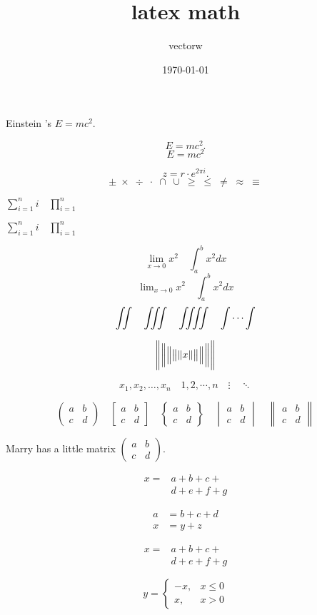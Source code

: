 \documentclass{article}
\title{latex math}
\author{vectorw}
\date{\today}
\begin{document}
Einstein 's $E=mc^2$.

\[ E=mc^2. \]
\begin{equation}
E=mc^2
\end{equation}

\[ z = r\cdot e^{2\pi i}. \]
\[ \pm\; \times\; \div\; \cdot\; \cap\; \cup\;
\geq\; \leq\; \neq\; \approx\; \equiv \]

$ \sum_{i=1}^n i\quad \prod_{i=1}^n $

$ \sum\limits _{i=1}^n i\quad \prod\limits _{i=1}^n $

\[ \lim_{x\to0}x^2 \quad \int_a^b x^2 dx \]
\[ \lim\nolimits_{x\to0}x^2 \quad \int\nolimits_a^b x^2 dx \]
\[ \iint\quad \iiint\quad \iiiint\quad \idotsint \]

\[ \Biggl\lVert \biggl\lVert \Bigl\lVert \bigl\lVert \lVert x
\rVert \bigr\rVert \Bigr\rVert \biggr\rVert \Biggr\rVert \]

\[ x_1,x_2,\dots,x_n \quad 1,2,\cdots,n\quad
\vdots\quad \ddots \]

\[ \begin{pmatrix} a&b \\ c&d \end{pmatrix} \quad
\begin{bmatrix} a&b \\ c&d \end{bmatrix} \quad
\begin{Bmatrix} a&b \\ c&d \end{Bmatrix} \quad
\begin{vmatrix} a&b \\ c&d \end{vmatrix} \quad
\begin{Vmatrix} a&b \\ c&d \end{Vmatrix} \]

Marry has a little matrix $( \begin{smallmatrix} a&b\\c&d \end{smallmatrix} )$.

\[\begin{aligned}
x ={}& a+b+c+{} \\
& d+e+f+g
\end{aligned}\]

\begin{align}
a &= b+c+d \\
x &= y+z
\end{align}

\begin{equation}
\begin{aligned}
x ={}& a+b+c+{} \\
& d+e+f+g
\end{aligned}
\end{equation}

\[ y=\begin{cases}
-x, &x\leq 0 \\
x, &x>0
\end{cases}
\]
\end{document}
